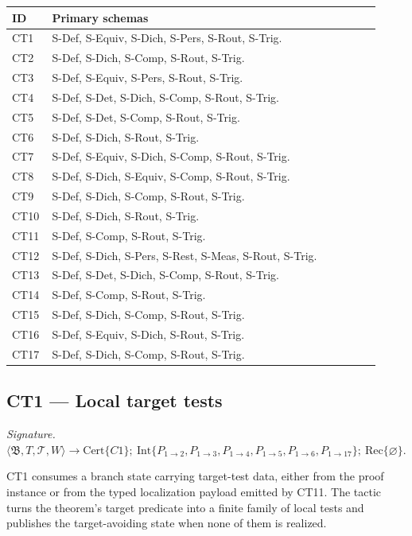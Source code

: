 \documentclass[
  11pt,
]{article}
\theoremstyle{definition}
\newcommand{\ctsignature}[1]{\par\noindent\emph{Signature.}\ #1\par\medskip}
\newcommand{\ctcert}[1]{\mathrm{Cert}\{#1\}}
\newcommand{\ctint}[1]{\mathrm{Int}\{#1\}}
\newcommand{\ctrec}[1]{\mathrm{Rec}\{#1\}}
\newcommand{\ctnone}{\varnothing}
\begin{document}
\begingroup
\scriptsize
\setlength{\tabcolsep}{2pt}
\begin{longtable}[]{@{}
  >{\raggedright\arraybackslash}p{0.08\linewidth}
  >{\raggedright\arraybackslash}p{0.84\linewidth}@{}}
\toprule\noalign{}
ID & Primary schemas \\
\midrule\noalign{}
\endhead
\bottomrule\noalign{}
\endlastfoot
CT1 & S-Def, S-Equiv, S-Dich, S-Pers, S-Rout, S-Trig. \\
CT2 & S-Def, S-Dich, S-Comp, S-Rout, S-Trig. \\
CT3 & S-Def, S-Equiv, S-Pers, S-Rout, S-Trig. \\
CT4 & S-Def, S-Det, S-Dich, S-Comp, S-Rout, S-Trig. \\
CT5 & S-Def, S-Det, S-Comp, S-Rout, S-Trig. \\
CT6 & S-Def, S-Dich, S-Rout, S-Trig. \\
CT7 & S-Def, S-Equiv, S-Dich, S-Comp, S-Rout, S-Trig. \\
CT8 & S-Def, S-Dich, S-Equiv, S-Comp, S-Rout, S-Trig. \\
CT9 & S-Def, S-Dich, S-Comp, S-Rout, S-Trig. \\
CT10 & S-Def, S-Dich, S-Rout, S-Trig. \\
CT11 & S-Def, S-Comp, S-Rout, S-Trig. \\
CT12 & S-Def, S-Dich, S-Pers, S-Rest, S-Meas, S-Rout, S-Trig. \\
CT13 & S-Def, S-Det, S-Dich, S-Comp, S-Rout, S-Trig. \\
CT14 & S-Def, S-Comp, S-Rout, S-Trig. \\
CT15 & S-Def, S-Dich, S-Comp, S-Rout, S-Trig. \\
CT16 & S-Def, S-Equiv, S-Dich, S-Rout, S-Trig. \\
CT17 & S-Def, S-Dich, S-Comp, S-Rout, S-Trig. \\
\end{longtable}
\endgroup
\subsection{CT1 --- Local target tests}\label{ct:1}\label{target-predicate-and-local-tests}
\ctsignature{\(\langle\mathfrak B,T,\mathcal T,W\rangle \to
\ctcert{C1};\allowbreak\ \ctint{P_{1\to2},\allowbreak P_{1\to3},\allowbreak P_{1\to4},\allowbreak P_{1\to5},\allowbreak P_{1\to6},\allowbreak P_{1\to17}};\allowbreak\ \ctrec{\ctnone}\).}

CT1 consumes a branch state carrying target-test data, either from the
proof instance or from the typed localization payload emitted by CT11.
The tactic turns the theorem's target predicate into a finite family of
local tests and publishes the target-avoiding state when none of them is
realized.
\end{document}
